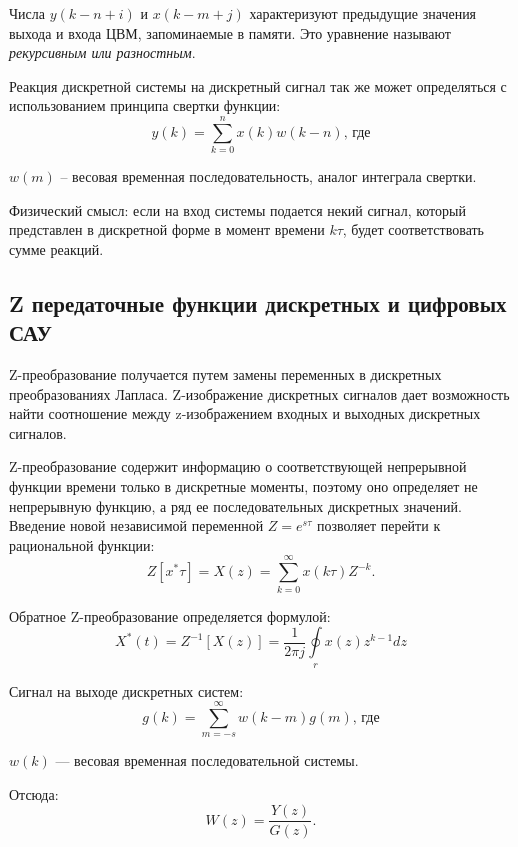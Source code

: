 \documentclass[unicode, 12pt, a4paper, oneside]{article}
\begin{document}
Числа $y(k-n+i)$ и $x(k-m+j)$ характеризуют предыдущие значения выхода и входа ЦВМ, запоминаемые в памяти. Это уравнение называют \textit{рекурсивным или разностным}.

Реакция дискретной системы на дискретный сигнал так же может определяться с использованием принципа свертки функции:
\begin{equation}
y(k) = \sum_{k=0}^{n} x(k) w(k-n)\text{, где}
\end{equation}
\par $w(m)$ – весовая временная последовательность, аналог интеграла свертки.

Физический смысл: если на вход системы подается некий сигнал, который представлен в дискретной форме в момент времени $ k\tau $, будет соответствовать сумме реакций.

\subsection*{Z передаточные функции дискретных и цифровых САУ}

Z-преобразование получается путем замены переменных в дискретных преобразованиях Лапласа. Z-изображение дискретных сигналов дает возможность найти соотношение между z-изображением входных и выходных дискретных сигналов.

Z-преобразование содержит информацию о соответствующей непрерывной  функции времени только в дискретные моменты, поэтому оно определяет не непрерывную функцию, а ряд ее последовательных дискретных значений. Введение новой независимой переменной $ Z=e^{s\tau} $ позволяет перейти к рациональной функции:
\begin{equation}
Z[x^*\tau] = X(z) = \sum_{k=0}^{\infty} x(k\tau) Z^{-k}.
\end{equation}

Обратное Z-преобразование определяется формулой:
\begin{equation}
X^*(t) = Z^{-1} [X(z)] = \dfrac{1}{2\pi j} \oint\limits_r x(z) z^{k -1} dz
\end{equation}

Сигнал на выходе дискретных систем:
\begin{equation}
g(k) = \sum_{m=-s}^{\infty} w(k - m)g(m)\text{, где}
\end{equation}
\par $ w(k) $ --- весовая временная последовательной системы.

Отсюда:
\begin{equation}
W(z) = \dfrac{Y(z)}{G(z)}.
\end{equation}
\end{document}
